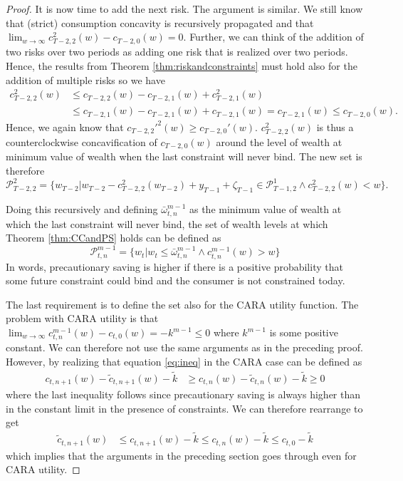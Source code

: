 \documentclass[titlepage]{\econtex}
\providecommand{\wAlt}{\omega}
\begin{document}
\begin{proof}
	It is now time to add the next risk. The argument is similar. We still know that (strict) consumption concavity is recursively propagated and that $\lim_{w\rightarrow \infty} c_{T-2,2}^2(w) - c_{T-2,0}(w) = 0$. Further, we can think of the addition of two risks over two periods as adding one risk that is realized over two periods. Hence, the results from Theorem \ref{thm:riskandconstraints} must hold also for the addition of multiple risks so we have
	\begin{align*}c_{T-2,2}^2(w) &\leq c_{T-2,2}(w) - c_{T-2,1}(w) + c_{T-2,1}^2(w) \\ &\leq c_{T-2,1}(w) - c_{T-2,1}(w) + c_{T-2,1}(w) = c_{T-2,1}(w) \leq c_{T-2,0}(w). \end{align*}
	Hence, we again know that $c_{T-2,2}'^{2}(w) \geq c_{T-2,0}'(w)$. $c_{T-2,2}^2(w)$ is thus a counterclockwise concavification of $c_{T-2,0}(w)$ around the level of wealth at minimum value of wealth when the last constraint will never bind. The new set is therefore
	\[\mathcal{P}_{T-2,2}^2 = \{w_{T-2} | w_{T-2} - c_{T-2,2}^2(w_{T-2}) + {y}_{T-1} + \zeta_{T-1} \in \mathcal{P}_{T-1,2}^1 \wedge c_{T-2,2}^{2}(w) < w \}.\]
	
	
	Doing this recursively and defining $\bar{\wAlt}_{t,n}^{m-1}$ as the minimum value of wealth at which the last constraint will never bind, the set of wealth levels at which Theorem \ref{thm:CCandPS} holds can be defined as
	\[\mathcal{P}_{t,n}^{m-1} = \{w_t | w_t \leq \bar{\wAlt}_{t,n}^{m-1} \wedge c_{t,n}^{m-1}(w) > w \}\]
	In words, precautionary saving is higher if there is a positive probability that some future constraint could bind and the consumer is not constrained today. 
	
	The last requirement is to define the set also for the CARA utility function. The problem with CARA utility is that $\lim_{w\rightarrow \infty} c_{t,n}^{m-1}(w) - c_{t,0}(w) = - k^{m-1} \leq 0$ where $k^{m-1}$ is some positive constant. We can therefore not use the same arguments as in the preceding proof. However, by realizing that equation \eqref{eq:ineq} in the CARA case can be defined as
	\begin{align*}
	c_{t,n+1}(w) - \tilde{c}_{t,n+1}(w) - \tilde{k} &\geq c_{t,n}(w)-\tilde{c}_{t,n}(w) -  \tilde{k} \geq 0 
	\end{align*}
	where the last inequality follows since precautionary saving is always higher than in the constant limit in the presence of constraints. We can therefore rearrange to get
	\begin{align*}
	\tilde{c}_{t,n+1}(w)  &\leq c_{t,n+1}(w) - \tilde{k} \leq c_{t,n}(w) - \tilde{k} \leq c_{t,0} - \tilde{k}	\end{align*}
	which implies that the arguments in the preceding section goes through even for CARA utility. 
	
\end{proof}
\end{document}
